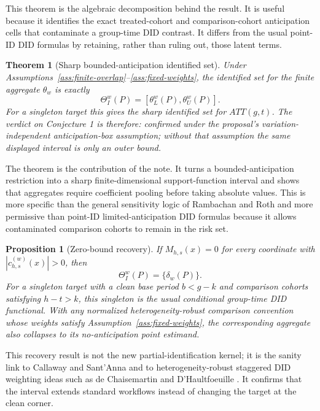 \documentclass[11pt]{article}
\theoremstyle{definition}
\theoremstyle{plain}
\newtheorem{theorem}{Theorem}
\newtheorem{proposition}{Proposition}
\theoremstyle{remark}
\begin{document}
This theorem is the algebraic decomposition behind the result.  It is useful
because it identifies the exact treated-cohort and comparison-cohort
anticipation cells that contaminate a group-time DID contrast.  It differs from
the usual point-ID DID formulas by retaining, rather than ruling out, those
latent terms.

\begin{theorem}[Sharp bounded-anticipation identified set]\label{thm:sharp-box-stage0}
Under Assumptions~\ref{ass:finite-overlap}--\ref{ass:fixed-weights}, the
identified set for the finite aggregate \(\theta_w\) is exactly
\[
  \Theta_I^w(P)=[\theta_L^w(P),\theta_U^w(P)].
\]
For a singleton target this gives the sharp identified set for \(ATT(g,t)\).  The
verdict on Conjecture 1 is therefore: confirmed under the proposal's
variation-independent anticipation-box assumption; without that assumption the
same displayed interval is only an outer bound.
\end{theorem}

The theorem is the contribution of the note.  It turns a bounded-anticipation
restriction into a sharp finite-dimensional support-function interval and shows
that aggregates require coefficient pooling before taking absolute values.  This
is more specific than the general sensitivity logic of Rambachan and Roth
\cite{RambachanRoth2023} and more permissive than point-ID limited-anticipation
DID formulas because it allows contaminated comparison cohorts to remain in the
risk set.

\begin{proposition}[Zero-bound recovery]\label{prop:zero-bound-recovery}
If \(M_{h,s}(x)=0\) for every coordinate with
\(|c^{(w)}_{h,s}(x)|>0\), then
\[
  \Theta_I^w(P)=\{\delta_w(P)\}.
\]
For a singleton target with a clean base period \(b<g-k\) and comparison cohorts
satisfying \(h-t>k\), this singleton is the usual conditional group-time DID
functional.  With any normalized heterogeneity-robust comparison convention whose
weights satisfy Assumption~\ref{ass:fixed-weights}, the corresponding aggregate
also collapses to its no-anticipation point estimand.
\end{proposition}

This recovery result is not the new partial-identification kernel; it is the
sanity link to Callaway and Sant'Anna \cite{CallawaySantAnna2021} and to
heterogeneity-robust staggered DID weighting ideas such as de Chaisemartin and
D'Haultfoeuille \cite{DCDH2020}.  It confirms that the interval extends standard
workflows instead of changing the target at the clean corner.
\end{document}
